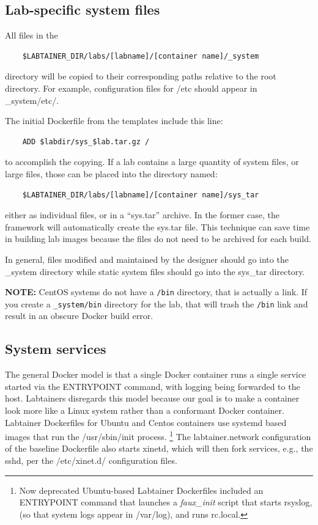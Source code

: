 \documentclass[12pt]{article}
\begin{document}
\subsection{Lab-specific system files}
All files in the
\begin{verbatim}
    $LABTAINER_DIR/labs/[labname]/[container name]/_system
\end{verbatim}
\noindent directory will be copied to their corresponding paths relative to the root directory.
For example, configuration files for /etc should appear in \_system/etc/.

The initial Dockerfile from the templates include this line:
\begin{verbatim}
    ADD $labdir/sys_$lab.tar.gz /
\end{verbatim}
\noindent to accomplish the copying. 
If a lab contains a large quantity of system files, or large files, those
can be placed into the directory named:
\begin{verbatim}
    $LABTAINER_DIR/labs/[labname]/[container name]/sys_tar
\end{verbatim}
either as individual files, or in a ``sys.tar'' archive.  In the former case,
the framework will automatically create the sys.tar file.  This technique 
can save time in building lab images because the files do not need to be 
archived for each build.  

In general, files modified and maintained by the designer should go into the
\_system directory while static system files should go into the sys\_tar directory.

\textbf{NOTE:} CentOS systems do not have a {\tt /bin} directory, that is actually a link.  If you
create a {\tt \_system/bin} directory for the lab, that will trash the {\tt /bin} link and result in 
an obscure Docker build error.

\subsection {System services}
The general Docker 
model is that a single Docker container runs a single service started via the ENTRYPOINT command, with logging being forwarded to 
the host.  Labtainers disregards this model because our goal is to make a container look more like a Linux
system rather than a conformant Docker container.  Labtainer Dockerfiles for Ubuntu and Centos containers
use systemd based images that run the /usr/sbin/init process.  \footnote {Now deprecated Ubuntu-based Labtainer Dockerfiles included an
ENTRYPOINT command that launches a \textit{faux\_init} script that starts rsyslog, (so that system logs
appear in /var/log), and runs rc.local.}  The labtainer.network configuration of the baseline Dockerfile also starts xinetd,
which will then fork services, e.g., the sshd, per the /etc/xinet.d/ configuration files.  
\end{document}
